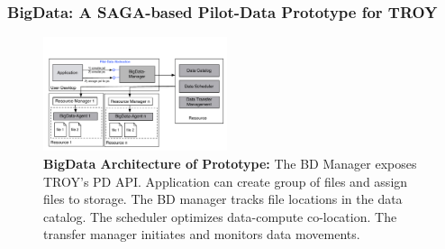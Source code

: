 \subsubsection*{BigData: A SAGA-based Pilot-Data Prototype for TROY}
\label{sec:bigdata}

\begin{figure}[t]
    \centering
    \includegraphics[width=0.48\textwidth]{figures/pilot-data-manager.pdf}
    \caption{\textbf{BigData Architecture of Prototype:} The BD Manager exposes
      TROY's PD API. Application can create group of files and assign
      files to storage. The BD manager tracks file locations in the
      data catalog. The scheduler optimizes data-compute co-location.
      The transfer manager initiates and monitors data
      movements. \up\up}
    \label{fig:pilot-data-architecture}
\end{figure}


